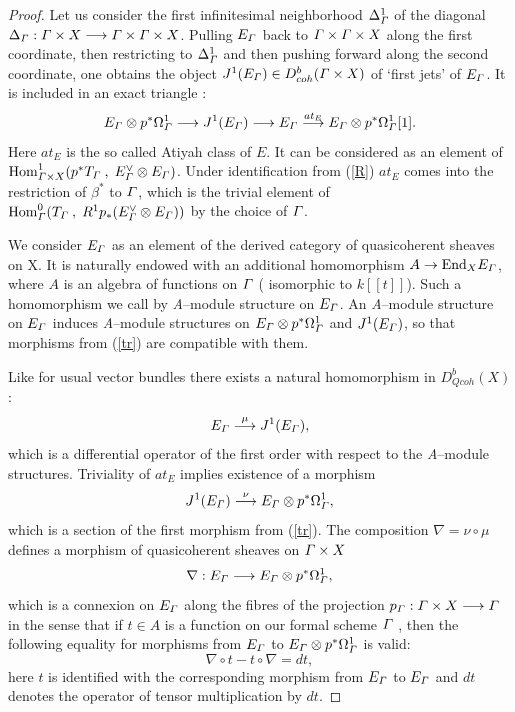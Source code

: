 \documentclass[12pt]{article}
\def\db#1{ D^b_{coh}({#1})}
\def\H#1,#2,#3,#4{{\rm Hom}^{#1}_{#2}({#3}\:,\; {#4})}
\def\lto{\longrightarrow}
\begin{document}
\begin{proof}
Let us consider the first infinitesimal neighborhood $\Delta^1_{\mit\Gamma}$ of the diagonal $\Delta_{\mit\Gamma} : {\mit\Gamma}\times X\lto {\mit\Gamma}\times {\mit\Gamma}\times X$. Pulling $E_{\mit\Gamma}$ back to ${\mit\Gamma}\times {\mit\Gamma}\times X$ 
 along the first coordinate, then restricting to $\Delta^1_{\mit\Gamma}$ and then pushing forward along the second coordinate, one obtains the object $J^1(E_{\mit\Gamma})\in \db{{\mit\Gamma}\times X}$ of `first jets' of $E_{\mit\Gamma}$. It is included in an exact triangle :
\begin{equation}\label{tr}
E_{\mit\Gamma}\otimes p^*\Omega^1_{\mit\Gamma}\lto J^1(E_{\mit\Gamma})\lto E_{\mit\Gamma}\stackrel{at_E}{\lto}
E_{\mit\Gamma}\otimes p^*\Omega^1_{\mit\Gamma}[1].
\end{equation}
Here $at_E$ is the so called Atiyah class of $E$. It can be considered as an element of ${\H 1, {\mit\Gamma\times X}, {p^*T_{\mit\Gamma} }, {E_{\mit\Gamma}^{\vee}\otimes E_{\mit\Gamma}}}$. Under identification from (\ref{R}) $at_E$ comes into the restriction of $\beta^*$ to $\mit\Gamma$, which is the trivial element of ${\H 0 , {\mit\Gamma}, {T_{\mit\Gamma}}, {R^1p_*(E_{\mit\Gamma}^{\vee}\otimes E_{\mit\Gamma})}}$ by the choice of $\mit\Gamma$.

We consider $E_{\mit\Gamma}$ as an element  of the derived category of quasicoherent sheaves on X. It is naturally endowed with an additional homomorphism $A\to {\rm End}_X E_{\mit\Gamma}$, where $A$ is an algebra of functions on ${\mit\Gamma}$ ( isomorphic to $k[[t]]$). Such a homomorphism          we call by {\it A}--module structure on $E_{\mit\Gamma}$. An {\it A}--module structure on $E_{\mit\Gamma}$ induces {\it A}--module structures on $E_{\mit\Gamma}\otimes p^*\Omega^1_{\mit\Gamma}$ and $J^1(E_{\mit\Gamma})$, so that morphisms from (\ref{tr}) are compatible with them.

Like for usual vector bundles there exists a natural homomorphism in $D^b_{Qcoh}(X)$ :
$$
 E_{\mit\Gamma}\stackrel{\mu}{\lto}J^1(E_{\mit\Gamma}) , 
$$
which is a differential operator of the first order with respect to the {\it A}--module structures. Triviality of $at_E$ implies existence of a morphism 
$$
J^1(E_{\mit\Gamma})\stackrel{\nu}{\lto}E_{\mit\Gamma}\otimes p^*\Omega^1_{\mit\Gamma},
$$
which is a section of the first morphism from (\ref{tr}). The composition $\nabla=\nu\circ\mu$ defines a morphism of quasicoherent sheaves on $\mit\Gamma\times X$
$$
\nabla : E_{\mit\Gamma}\lto E_{\mit\Gamma}\otimes p^*\Omega^1_{\mit\Gamma},
$$
which is a connexion on $E_{\mit\Gamma}$ along the fibres of the projection $p_{\mit\Gamma} :{\mit\Gamma}\times X \lto {\mit\Gamma}$ in the sense that if $t\in A$ is a function on our formal scheme $\mit\Gamma$ , then the following equality for morphisms from $E_{\mit\Gamma}$ to $E_{\mit\Gamma}\otimes p^*\Omega^1_{\mit\Gamma}$ is valid:
\begin{equation}\label{con}
\nabla{\circ}t - t{\circ}\nabla=dt, 
\end{equation}
here $t$ is identified with the corresponding morphism from $E_{\mit\Gamma}$ to $E_{\mit\Gamma}$ and $dt$ denotes the operator of tensor multiplication by $dt$.


\end{proof}
\end{document}
